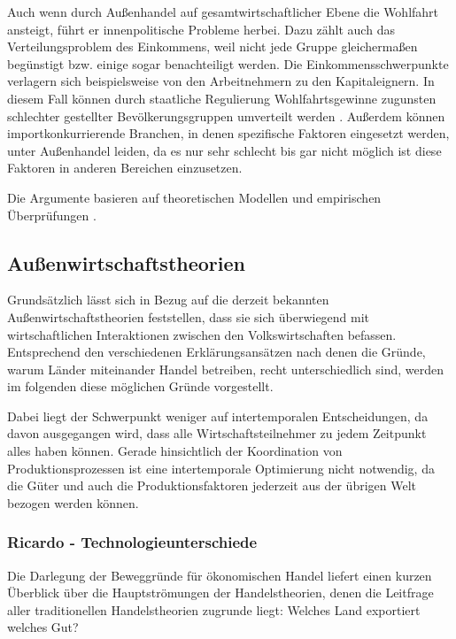 Auch wenn durch Au{\ss}enhandel auf gesamtwirtschaftlicher Ebene die Wohlfahrt ansteigt, f{\"u}hrt er innenpolitische Probleme herbei. Dazu z{\"a}hlt auch das Verteilungsproblem des Einkommens, weil nicht jede Gruppe gleicherma{\ss}en beg{\"u}nstigt bzw. einige sogar benachteiligt werden. Die Einkommensschwerpunkte verlagern sich beispielsweise von den Arbeitnehmern zu den Kapitaleignern. In diesem Fall können durch staatliche Regulierung Wohlfahrtsgewinne zugunsten schlechter gestellter Bev{\"o}lkerungsgruppen umverteilt werden \citep{Dixit.1980}. Au{\ss}erdem k{\"o}nnen importkonkurrierende Branchen, in denen spezifische Faktoren eingesetzt werden, unter Au{\ss}enhandel leiden, da es nur sehr schlecht bis gar nicht m{\"o}glich ist diese Faktoren in anderen Bereichen einzusetzen.


Die Argumente basieren auf theoretischen Modellen und empirischen {\"U}berpr{\"u}fungen \citep[Kapitel 1]{Krugman.2015}.

\subsection{Au{\ss}enwirtschaftstheorien}
Grundsätzlich lässt sich in Bezug auf die derzeit bekannten Au{\ss}enwirtschaftstheorien feststellen, dass sie sich überwiegend mit wirtschaftlichen Interaktionen zwischen den Volkswirtschaften befassen.
Entsprechend den verschiedenen Erklärungsansätzen nach denen die Gründe, warum Länder miteinander Handel betreiben, recht unterschiedlich sind, werden im folgenden diese möglichen Gründe vorgestellt.


Dabei liegt der Schwerpunkt weniger auf intertemporalen Entscheidungen, da davon ausgegangen wird, dass alle Wirtschaftsteilnehmer zu jedem Zeitpunkt alles haben k{\"o}nnen. Gerade hinsichtlich der Koordination von Produktionsprozessen ist eine intertemporale Optimierung nicht notwendig, da die G{\"u}ter und auch die Produktionsfaktoren jederzeit aus der {\"u}brigen Welt bezogen werden k{\"o}nnen.


\subsubsection{Ricardo - Technologieunterschiede}
Die Darlegung der Beweggründe für ökonomischen Handel liefert einen kurzen {\"U}berblick {\"u}ber die Hauptstr{\"o}mungen der Handelstheorien, denen die Leitfrage aller traditionellen Handelstheorien zugrunde liegt: Welches Land exportiert welches Gut? \newline 


